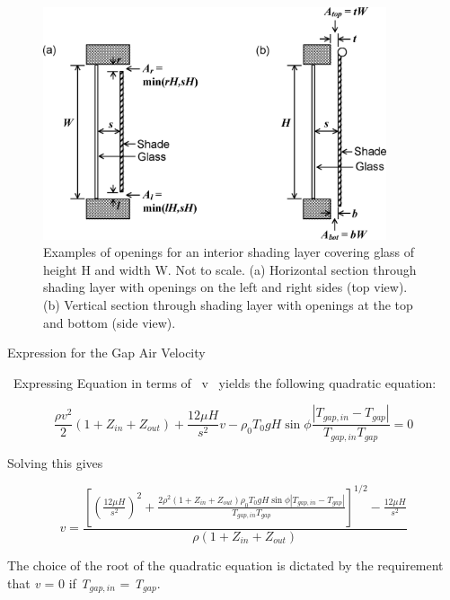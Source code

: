 \begin{figure}[hbtp] %
\centering
\includegraphics[width=0.9\textwidth, height=0.9\textheight, keepaspectratio=true]{media/image1679.png}
\caption{  Examples of openings for an interior shading layer covering glass of height H and width W. Not to scale. (a) Horizontal section through shading layer with openings on the left and right sides (top view). (b) Vertical section through shading layer with openings at the top and bottom (side view). \protect \label{fig:examples-of-openings-for-an-interior-shading}}
\end{figure}

Expression for the Gap Air Velocity

~Expressing Equation in terms of~ v~ yields the following quadratic equation:

\begin{equation}
\frac{{\rho {v^2}}}{2}\left( {1 + {Z_{in}} + {Z_{out}}} \right) + \frac{{12\mu H}}{{{s^2}}}v - {\rho_0}{T_0}gH\sin \phi \frac{{\left| {{T_{gap,in}} - {T_{gap}}} \right|}}{{{T_{gap,in}}{T_{gap}}}} = 0
\end{equation}

Solving this gives

\begin{equation}
v = \frac{{{{\left[ {{{\left( {\frac{{12\mu H}}{{{s^2}}}} \right)}^2} + \frac{{2{\rho ^2}(1 + {Z_{in}} + {Z_{out}}){\rho_0}{T_0}gH\sin \phi \left| {{T_{gap,in}} - {T_{gap}}} \right|}}{{{T_{gap,in}}{T_{gap}}}}} \right]}^{1/2}} - \frac{{12\mu H}}{{{s^2}}}}}{{\rho (1 + {Z_{in}} + {Z_{out}})}}
\end{equation}

The choice of the root of the quadratic equation is dictated by the requirement that \emph{v} = 0 if \emph{T\(_{gap,in}\)} = \emph{T\(_{gap}\)}.

